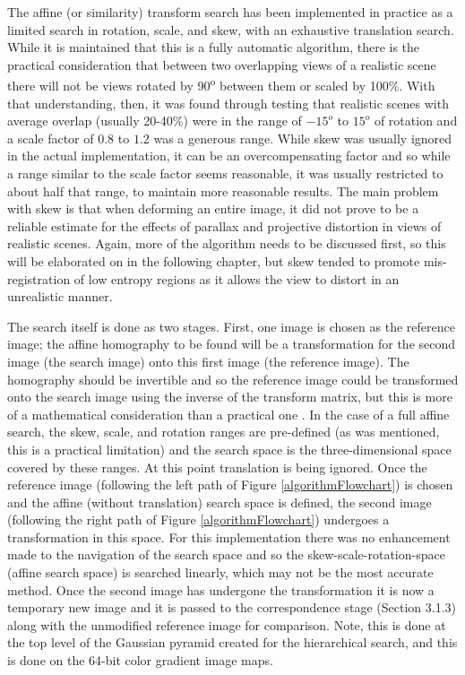 The affine (or similarity) transform search has been implemented in practice as a limited search in rotation, scale, and skew, with an exhaustive translation search. While it is maintained that this is a fully automatic algorithm, there is the practical consideration that between two overlapping views of a realistic scene there will not be views rotated by 90\textsuperscript{o} between them or scaled by 100\%. With that understanding, then, it was found through testing that realistic scenes with average overlap (usually 20-40\%) were in the range of $-15^{o}$ to $15^{o}$ of rotation and a scale factor of $0.8$ to $1.2$ was a generous range. While skew was usually ignored in the actual implementation, it can be an overcompensating factor and so while a range similar to the scale factor seems reasonable, it was usually restricted to about half that range, to maintain more reasonable results. The main problem with skew is that when deforming an entire image, it did not prove to be a reliable estimate for the effects of parallax and projective distortion in views of realistic scenes. Again, more of the algorithm needs to be discussed first, so this will be elaborated on in the following chapter, but skew tended to promote mis-registration of low entropy regions as it allows the view to distort in an unrealistic manner.

The search itself is done as two stages. First, one image is chosen as the reference image; the affine homography to be found will be a transformation for the second image (the search image) onto this first image (the reference image). The homography should be invertible and so the reference image could be transformed onto the search image using the inverse of the transform matrix, but this is more of a mathematical consideration than a practical one \cite{Hartley2003}. In the case of a full affine search, the skew, scale, and rotation ranges are pre-defined (as was mentioned, this is a practical limitation) and the search space is the three-dimensional space covered by these ranges. At this point translation is being ignored. Once the reference image (following the left path of Figure \ref{algorithmFlowchart}) is chosen and the affine (without translation) search space is defined, the second image (following the right path of Figure \ref{algorithmFlowchart}) undergoes a transformation in this space. For this implementation there was no enhancement made to the navigation of the search space and so the skew-scale-rotation-space (affine search space) is searched linearly, which may not be the most accurate method. Once the second image has undergone the transformation it is now a temporary new image and it is passed to the correspondence stage (Section 3.1.3) along with the unmodified reference image for comparison. Note, this is done at the top level of the Gaussian pyramid created for the hierarchical search, and this is done on the 64-bit color gradient image maps.

